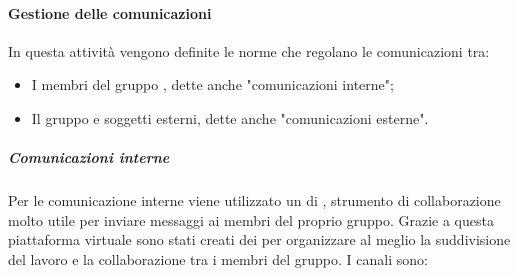 \paragraph{Gestione delle comunicazioni}

In questa attività vengono definite le norme che regolano le comunicazioni tra:
\begin{itemize}
	\item I membri del gruppo \Gruppo{}, dette anche "comunicazioni interne";
	\item Il gruppo e soggetti esterni, dette anche "comunicazioni esterne".
\end{itemize}

\subparagraph*{Comunicazioni interne}
Per le comunicazione interne viene utilizzato un  di , strumento di collaborazione molto utile per inviare messaggi ai membri del proprio gruppo.
Grazie a questa piattaforma virtuale sono stati creati dei  per organizzare al meglio la suddivisione del lavoro e la collaborazione tra i membri del gruppo.
I canali sono:

